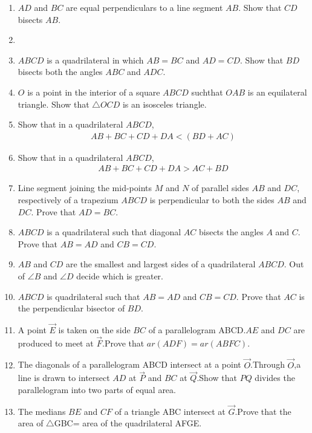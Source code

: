 \begin{enumerate}[label=\arabic*.,ref=\thesubsection.\theenumi]
\begin{enumerate}
\end{enumerate}
	\solution
%
\item $AD$ and $BC$ are equal perpendiculars to a line segment $AB$. Show that $CD$ bisects $AB$.\\
	\solution
%
\item
%
%
\item $ABCD$ is a quadrilateral in which $AB = BC$ and $AD = CD$. Show that $BD$ bisects both the angles $ABC$ and $ADC$.
\item $O$ is a point in the interior of a square $ABCD$ suchthat $OAB$ is an equilateral triangle. Show that $\triangle  OCD$ is an isosceles triangle.
\item Show that in a quadrilateral $ABCD$, 
\begin{align}
     AB + BC + CD + DA  <  (BD + AC)
\end{align} 
\item Show that in a quadrilateral $ABCD$,
\begin{align}
 AB + BC + CD + DA  >   AC + BD
\end{align}
\item Line segment joining the mid-points $M$ and $N$ of parallel sides $AB$ and $DC$, respectively of a trapezium $ABCD$ is perpendicular to both the sides $AB$ and $DC$. Prove that $AD = BC$.
\item $ABCD$ is a quadrilateral such that diagonal $AC$ bisects the angles $A$ and $C$. Prove that $AB = AD$ and $CB = CD$.
\item $AB$ and $CD$ are the smallest and largest sides of a quadrilateral $ABCD$. Out of $\angle B$ and $\angle D$ decide which is greater.
\item $ABCD$ is quadrilateral such that $AB = AD$ and $CB = CD$. Prove that $AC$ is the perpendicular bisector of $BD$.
\item A point $\vec{E} $ is taken on the side $BC$ of a parallelogram ABCD.$AE$ and  $DC$ are produced to meet at $\vec{F}$.Prove that  $ar (ADF) = ar (ABFC)$.
\item The diagonals of a parallelogram ABCD intersect at a point $\vec{O}$.Through $\vec{O}$,a line is drawn to intersect $AD$ at $\vec{P}$ and $BC$ at $\vec{Q}$.Show that $PQ$ divides the parallelogram into two parts of equal area.
\item The medians $BE$ and $CF$ of a triangle ABC intersect at $\vec{G}$.Prove that the area of $ \triangle${GBC}= area of the quadrilateral AFGE.	

\end{enumerate}
